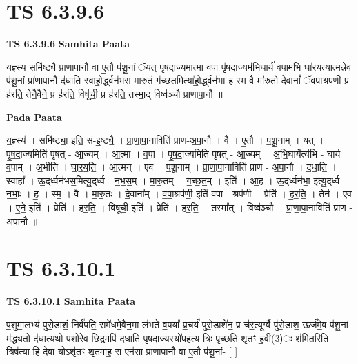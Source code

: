 \documentclass[17pt]{extarticle}
\begin{document}
\section{ TS 6.3.9.6 }

\textbf{TS 6.3.9.6 } \newline
\textbf{Samhita Paata} \newline

य॒ज्ञ्स्य॒ समि॑ष्ट्यै प्राणापा॒नौ वा ए॒तौ प॑शू॒नां ॅयत् पृ॑षदा॒ज्यमा॒त्मा व॒पा पृ॑षदा॒ज्यम॑भि॒घार्य॑ व॒पाम॒भि घा॑रयत्या॒त्मन्ने॒व प॑शू॒नां प्रा॑णापा॒नौ द॑धाति॒ स्वाहो॒र्द्ध्वन॑भसं मारु॒तं ग॑च्छत॒मित्या॑हो॒र्द्ध्वन॑भा ह स्म॒ वै मा॑रु॒तो दे॒वानां᳚ ॅवपा॒श्रप॑णी॒ प्र ह॑रति॒ तेनै॒वैने॒ प्र ह॑रति॒ विषू॑ची॒ प्र ह॑रति॒ तस्मा॒द् विष्व॑ञ्चौ प्राणापा॒नौ ॥ \newline

\textbf{Pada Paata} \newline

य॒ज्ञ्स्य॑ । समि॑ष्ट्या॒ इति॒ सं-इ॒ष्ट्यै॒ । प्रा॒णा॒पा॒नाविति॑ प्राण-अ॒पा॒नौ । वै । ए॒तौ । प॒शू॒नाम् । यत् । पृ॒ष॒दा॒ज्यमिति॑ पृषत् - आ॒ज्यम् । आ॒त्मा । व॒पा । पृ॒ष॒दा॒ज्यमिति॑ पृषत् - आ॒ज्यम् । अ॒भि॒घार्येत्य॑भि - घार्य॑ । व॒पाम् । अ॒भीति॑ । घा॒र॒य॒ति॒ । आ॒त्मन् । ए॒व । प॒शू॒नाम् । प्रा॒णा॒पा॒नाविति॑ प्राण - अ॒पा॒नौ । द॒धा॒ति॒ । स्वाहा᳚ । ऊ॒द्‌र्ध्वन॑भस॒मित्यू॒द्‌र्ध्व - न॒भ॒स॒म् । मा॒रु॒तम् । ग॒च्छ॒त॒म् । इति॑ । आ॒ह॒ । ऊ॒द्‌र्ध्वन॑भा॒ इत्यू॒द्‌र्ध्व - न॒भाः॒ । ह॒ । स्म॒ । वै । मा॒रु॒तः । दे॒वाना᳚म् । व॒पा॒श्रप॑णी॒ इति॑ वपा - श्रप॑णी । प्रेति॑ । ह॒र॒ति॒ । तेन॑ । ए॒व । ए॒ने॒ इति॑ । प्रेति॑ । ह॒र॒ति॒ । विषू॑ची॒ इति॑ । प्रेति॑ । ह॒र॒ति॒ । तस्मा᳚त् । विष्व॑ञ्चौ । प्रा॒णा॒पा॒नाविति॑ प्राण - अ॒पा॒नौ ॥  \newline





\section{ TS 6.3.10.1 }

\textbf{TS 6.3.10.1 } \newline
\textbf{Samhita Paata} \newline

प॒शुमा॒लभ्य॑ पुरो॒डाशं॒ निर्व॑पति॒ समे॑धमे॒वैन॒मा ल॑भते व॒पया᳚ प्र॒चर्य॑ पुरो॒डाशे॑न॒ प्र च॑र॒त्यूर्ग्वै पु॑रो॒डाश॒ ऊर्ज॑मे॒व प॑शू॒नां म॑द्ध्य॒तो द॑धा॒त्यथो॑ प॒शोरे॒व छि॒द्रमपि॑ दधाति पृषदा॒ज्यस्यो॑प॒हत्य॒ त्रिः पृ॑च्छति शृ॒तꣳ ह॒वी(3)ः श॑मित॒रिति॒ त्रिष॑त्या॒ हि दे॒वा योऽशृ॑तꣳ शृ॒तमाह॒ स एन॑सा प्राणापा॒नौ वा ए॒तौ प॑शू॒नां- [  ] \newline
\end{document}
